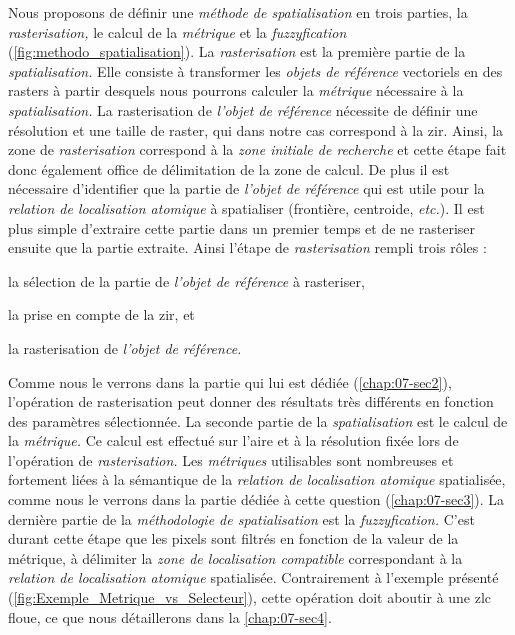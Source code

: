 Nous proposons de définir une \emph{méthode de spatialisation} en
trois parties, la \emph{rasterisation,} le calcul de la
\emph{métrique} et la \emph{fuzzyfication}
(\autoref{fig:methodo_spatialisation}). La \emph{rasterisation} est la
première partie de la \emph{spatialisation.} Elle consiste à
transformer les \emph{objets de référence} vectoriels en des rasters à
partir desquels nous pourrons calculer la \emph{métrique} nécessaire à
la \emph{spatialisation.} La rasterisation de \emph{l'objet de
  référence} nécessite de définir une résolution et une taille de
raster, qui dans notre cas correspond à la \ac{zir}. Ainsi, la zone de
\emph{rasterisation} correspond à la \emph{zone initiale de recherche}
et cette étape fait donc également office de délimitation de la zone
de calcul. De plus il est nécessaire d'identifier que la partie de
\emph{l'objet de référence} qui est utile pour la \emph{relation de
  localisation atomique} à spatialiser (\eg frontière, centroide,
\emph{etc.}). Il est plus simple d'extraire cette partie dans un
premier temps et de ne rasteriser ensuite que la partie
extraite. Ainsi l'étape de \emph{rasterisation} rempli trois rôles :
%
\begin{enumerate*}[label=(\alph*)]
\item la sélection de la partie de \emph{l'objet de référence} à rasteriser,
\item la prise en compte de la \ac{zir}, et
\item la rasterisation de \emph{l'objet de référence.}  
\end{enumerate*}
%
Comme nous le verrons dans la partie qui lui est dédiée
(\autoref{chap:07-sec2}), l'opération de rasterisation peut donner des
résultats très différents en fonction des paramètres sélectionnée. La
seconde partie de la \emph{spatialisation} est le calcul de la
\emph{métrique.} Ce calcul est effectué sur l'aire et à la résolution
fixée lors de l'opération de \emph{rasterisation.} Les
\emph{métriques} utilisables sont nombreuses et fortement liées à la
sémantique de la \emph{relation de localisation atomique} spatialisée,
comme nous le verrons dans la partie dédiée à cette question
(\autoref{chap:07-sec3}). La dernière partie de la \emph{méthodologie
  de spatialisation} est la \emph{fuzzyfication.} C'est durant cette
étape que les pixels sont filtrés en fonction de la valeur de la
métrique, à délimiter la \emph{zone de localisation compatible}
correspondant à la \emph{relation de localisation atomique}
spatialisée. Contrairement à l'exemple présenté
(\autoref{fig:Exemple_Metrique_vs_Selecteur}), cette opération doit
aboutir à une \ac{zlc} floue, ce que nous détaillerons dans la
\autoref{chap:07-sec4}.


